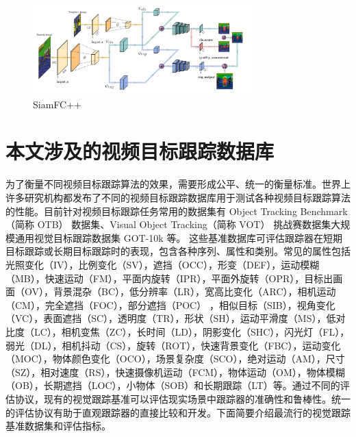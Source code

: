 \begin{figure}
\centering
\includegraphics[width=0.75\textwidth]{Img/related/SiamFC++.png}
\caption{SiamFC++}
\end{figure}
\fi
\section{本文涉及的视频目标跟踪数据库}
为了衡量不同视频目标跟踪算法的效果，需要形成公平、统一的衡量标准。世界上许多研究机构都发布了不同的视频目标跟踪数据库用于测试各种视频目标跟踪算法的性能。目前针对视频目标跟踪任务常用的数据集有 Object Tracking Benchmark（简称 OTB）\cite{OTB} 数据集、Visual Object Tracking（简称 VOT）\cite{VOT2015} 挑战赛数据集大规模通用视觉目标跟踪数据集 GOT-10k \cite{GOT-10k} 等。
这些基准数据库可评估跟踪器在短期目标跟踪或长期目标跟踪时的表现，包含各种序列、属性和类别。常见的属性包括光照变化（IV），比例变化（SV），遮挡（OCC），形变（DEF），运动模糊（MB），快速运动（FM），平面内旋转（IPR），平面外旋转（OPR），目标出画面（OV），背景混杂（BC），低分辨率（LR），宽高比变化（ARC），相机运动（CM），完全遮挡（FOC），部分遮挡（POC） ，相似目标（SIB），视角变化（VC），表面遮挡（SC），透明度（TR），形状（SH），运动平滑度（MS），低对比度（LC），相机变焦（ZC），长时间（LD），阴影变化（SHC），闪光灯（FL），弱光（DL），相机抖动（CS），旋转（ROT），快速背景变化（FBC），运动变化（MOC），物体颜色变化（OCO），场景复杂度（SCO），绝对运动（AM），尺寸（SZ），相对速度（RS），快速摄像机运动（FCM），物体运动（OM），物体模糊（OB），长期遮挡（LOC），小物体（SOB）和长期跟踪（LT）等。通过不同的评估协议，现有的视觉跟踪基准可以评估现实场景中跟踪器的准确性和鲁棒性。统一的评估协议有助于直观跟踪器的直接比较和开发。下面简要介绍最流行的视觉跟踪基准数据集和评估指标。
